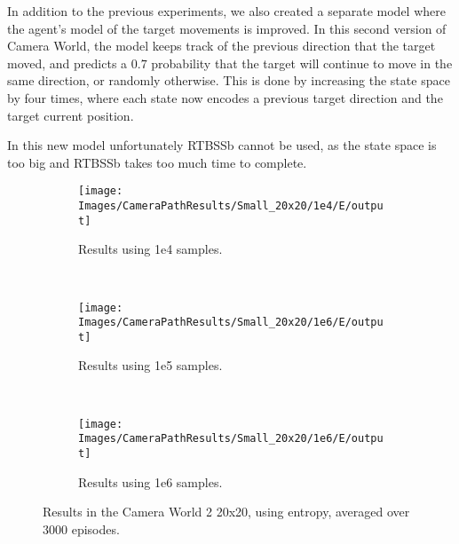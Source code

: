 In addition to the previous experiments, we also created a separate model where the agent's model of
the target movements is improved. In this second version of Camera World, the model keeps track of
the previous direction that the target moved, and predicts a $0.7$ probability that the target will
continue to move in the same direction, or randomly otherwise. This is done by increasing the state
space by four times, where each state now encodes a previous target direction and the target current
position.

In this new model unfortunately RTBSSb cannot be used, as the state space is too big and RTBSSb
takes too much time to complete.

\begin{figure}[ht!]
        \centering
        \begin{subfigure}[t]{0.3\textwidth}
                \texttt{[image: Images/CameraPathResults/Small\_20x20/1e4/E/output]}
                \caption{Results using 1e4 samples.}
                \label{fig:cps4e}
        \end{subfigure}%
        ~ %
        \begin{subfigure}[t]{0.3\textwidth}
                \texttt{[image: Images/CameraPathResults/Small\_20x20/1e6/E/output]}
                \caption{Results using 1e5 samples.}
                \label{fig:cps5e}
        \end{subfigure}
        ~ %
        \begin{subfigure}[t]{0.3\textwidth}
                \texttt{[image: Images/CameraPathResults/Small\_20x20/1e6/E/output]}
                \caption{Results using 1e6 samples.}
                \label{fig:cps6e}
        \end{subfigure}
        \caption{Results in the Camera World 2 20x20, using entropy, averaged over 3000 episodes.}\label{fig:cpse}
\end{figure}

